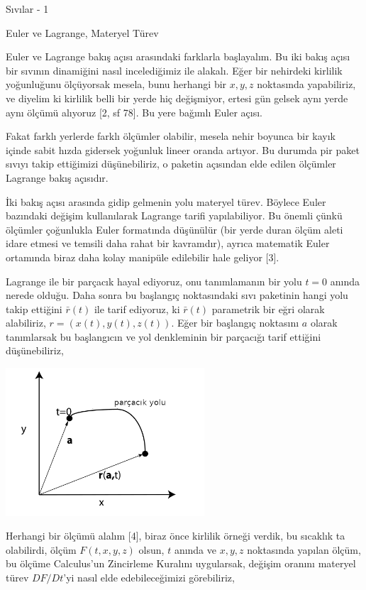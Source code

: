 \documentclass[12pt,fleqn]{article}\usepackage{../../common}
\begin{document}
Sıvılar - 1

Euler ve Lagrange, Materyel Türev

Euler ve Lagrange bakış açısı arasındaki farklarla başlayalım. Bu iki bakış
açısı bir sıvının dinamiğini nasıl incelediğimiz ile alakalı. Eğer bir nehirdeki
kirlilik yoğunluğunu ölçüyorsak mesela, bunu herhangi bir $x,y,z$ noktasında
yapabiliriz, ve diyelim ki kirlilik belli bir yerde hiç değişmiyor, ertesi gün
gelsek aynı yerde aynı ölçümü alıyoruz [2, sf 78]. Bu yere bağımlı Euler açısı.

Fakat farklı yerlerde farklı ölçümler olabilir, mesela nehir boyunca bir kayık
içinde sabit hızda gidersek yoğunluk lineer oranda artıyor. Bu durumda pir paket
sıvıyı takip ettiğimizi düşünebiliriz, o paketin açısından elde edilen ölçümler
Lagrange bakış açısıdır. 

İki bakış açısı arasında gidip gelmenin yolu materyel türev. Böylece Euler
bazındaki değişim kullanılarak Lagrange tarifi yapılabiliyor. Bu önemli çünkü
ölçümler çoğunlukla Euler formatında düşünülür (bir yerde duran ölçüm aleti
idare etmesi ve temsili daha rahat bir kavramdır), ayrıca matematik Euler
ortamında biraz daha kolay manipüle edilebilir hale geliyor [3].

Lagrange ile bir parçacık hayal ediyoruz, onu tanımlamanın bir yolu $t=0$ anında
nerede olduğu. Daha sonra bu başlangıç noktasındaki sıvı paketinin hangi yolu
takip ettiğini $\bar{r}(t)$ ile tarif ediyoruz, ki $\bar{r}(t)$ parametrik bir
eğri olarak alabiliriz, $r = ( x(t), y(t), z(t) )$. Eğer bir başlangıç
noktasını $a$ olarak tanımlarsak bu başlangıcın ve yol denkleminin bir parçacığı
tarif ettiğini düşünebiliriz,

\includegraphics[width=20em]{phy_050_cons_02.png}

Herhangi bir ölçümü alalım [4], biraz önce kirlilik örneği verdik, bu
sıcaklık ta olabilirdi, ölçüm $F(t,x,y,z)$ olsun, $t$ anında ve $x,y,z$
noktasında yapılan ölçüm, bu ölçüme Calculus'un Zincirleme Kuralını uygularsak,
değişim oranını materyel türev $D F / Dt$'yi nasıl elde edebileceğimizi
görebiliriz,
\end{document}
